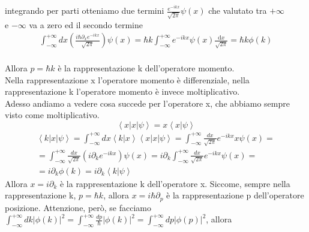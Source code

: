 \begin{flushleft}
\begin{equation}
\begin{split}
\end{split}\end{equation}\\
integrando per parti otteniamo due termini $\frac{e^{-ikx}}{\sqrt{2\pi}}\psi\left(x\right)$ che valutato tra $+\infty$ \\e $-\infty$ va a zero ed il secondo termine \\
\begin{equation}\begin{split}
\int^{+\infty }_{-\infty } {dx\left(\frac{i\hbar\partial_x e^{-ikx}}{\sqrt{2\pi}}\right)\psi\left(x\right)}=\hbar k\int^{+\infty }_{-\infty }{e^{-ikx}\psi \left(x\right) \frac{\textrm{d}x}{\sqrt{2\pi}}}=\hbar k\phi \left(k\right)
\end{split}\end{equation}\\
Allora $p=\hbar k$ è la rappresentazione k dell'operatore momento.\\
Nella rappresentazione x l'operatore momento è differenziale, nella rappresentazione k l'operatore momento è invece moltiplicativo.\\
Adesso andiamo a vedere cosa succede per l'operatore x, che abbiamo sempre visto come moltiplicativo.
$$\left\langle x|x|\psi\right\rangle=x\left\langle x|\psi\right\rangle$$
\begin{equation}\begin{split}
\left\langle k|x|\psi\right\rangle=\int^{+\infty }_{-\infty } {dx \left\langle k|x\right\rangle \left\langle x|x|\psi\right\rangle}=\int^{+\infty }_{-\infty }{\frac{dx}{\sqrt{2\pi}} e^{-ikx}x\psi\left(x\right)}=
\\=\int^{+\infty }_{-\infty }{\frac{dx}{\sqrt{2\pi}}\left(i\partial_k e^{-ikx}\right)\psi\left(x\right)}=
i\partial_k \int^{+\infty }_{-\infty }{\frac{dx}{\sqrt{2\pi}}e^{-ikx}\psi\left(x\right)}=\\
=i\partial_k\phi \left(k\right)=i\partial_k\left\langle k|\psi\right\rangle
\end{split}\end{equation}
Allora $x=i\partial_k$ è la rappresentazione k dell'operatore x. Siccome, sempre nella rappresentazione k,  $p=\hbar k$, allora $x=i\hbar\partial_p$ è la rappresentazione p dell'operatore posizione.
Attenzione, però, se facciamo\\
$\int^{+\infty }_{-\infty } dk |\phi\left(k\right)|^2=\int^{+\infty }_{-\infty } \frac{dp}{\hbar}|\phi\left(k\right)|^2=\int^{+\infty }_{-\infty } dp |\phi\left(p\right)|^2$, allora\\

\end{flushleft}
